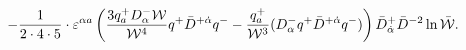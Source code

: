 \begin{equation}\label{extra_term_2}
-{1\over 2\cdot 4\cdot 5}\cdot
\varepsilon^{\alpha a}
\left(
{3 q^{+}_{a}D^{-}_{\alpha}{\cal W}\over {\cal
W}^4}q^{+}\bar{D}^{+\dot\alpha}q^{-}
- {q^{+}_{a}\over {\cal W}^3}(D^{-}_{\alpha}q^{+}\bar{D}^{+\dot\alpha}q^{-})
\right)\bar{D}^{+}_{\dot\alpha}\bar{D}^{-2} \ln \bar{\cal W}.
\end{equation}

